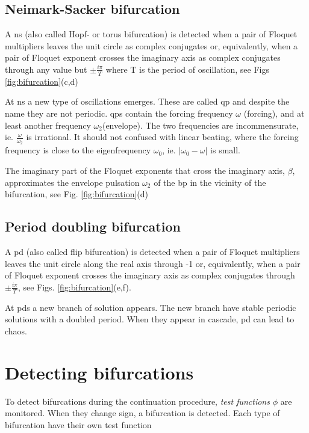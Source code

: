 \subsection{Neimark-Sacker bifurcation}
\label{sec:ns_bif}

A \gls{ns} (also called Hopf- or torus bifurcation) is detected when a pair of
Floquet multipliers leaves the unit circle as complex conjugates or,
equivalently, when a pair of Floquet exponent crosses the imaginary axis as
complex conjugates through any value but $\pm \frac{i\pi}{T}$ where T is the
period of oscillation, see Figs \ref{fig:bifurcation}(c,d)

At \gls{ns} a new type of oscillations emerges. These are called \gls{qp} and
despite the name they are not periodic. \glspl{qp} contain the forcing frequency
$\omega$ (forcing), and at least another frequency $\omega_2$(envelope). The two
frequencies are incommensurate, ie. $\frac{\omega}{\omega_2}$ is irrational. It
should not confused with linear beating, where the forcing frequency is close to
the eigenfrequency $\omega_0$, ie. $|\omega_0 - \omega|$ is small.

The imaginary part of the Floquet exponents that cross the imaginary axis,
$\beta$, approximates the envelope pulsation $\omega_2$ of the \gls{bp} in the
vicinity of the bifurcation, see Fig. \ref{fig:bifurcation}(d)


\subsection{Period doubling bifurcation}
\label{sec:pd_bif}

A \gls{pd} (also called flip bifurcation) is detected when a pair of Floquet
multipliers leaves the unit circle along the real axis through -1 or,
equivalently, when a pair of Floquet exponent crosses the imaginary axis as
complex conjugates through $\pm\frac{i\pi}{T}$, see Figs.
\ref{fig:bifurcation}(e,f).

At \glspl{pd} a new branch of solution appears. The new branch have stable
periodic solutions with a doubled period. When they appear in cascade, \gls{pd}
can lead to chaos.


\section{Detecting bifurcations}
\label{sec:detecting_bifs}

To detect bifurcations during the continuation procedure, \textit{test
  functions} $\phi$ are monitored. When they change sign, a bifurcation is
detected. Each type of bifurcation have their own test function


